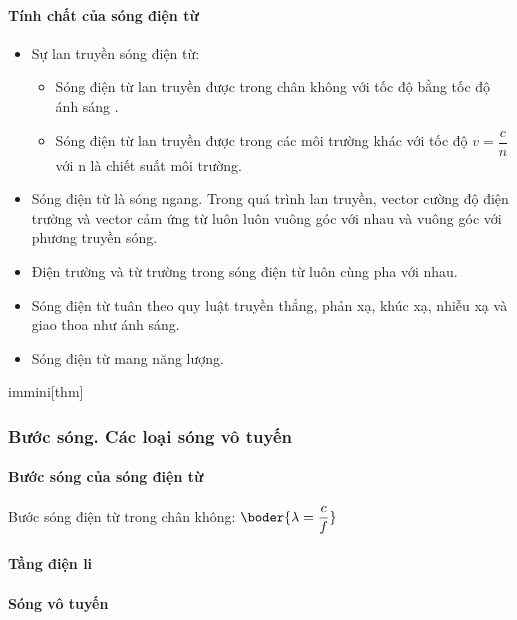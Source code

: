 \paragraph{Tính chất của sóng điện từ}
\begin{itemize}
\item Sự lan truyền sóng điện từ:
\begin{itemize}
\item Sóng điện từ lan truyền được trong chân không với tốc độ bằng tốc độ ánh sáng . 
\item Sóng điện từ lan truyền được trong các môi trường khác với tốc độ $v=\dfrac{c}{n}$ với n là chiết suất môi trường. 
\end{itemize}
\item Sóng điện từ là sóng ngang. Trong quá trình lan truyền, vector cường độ điện trường  và vector cảm ứng từ  luôn luôn vuông góc với nhau và vuông góc với phương truyền sóng. 
\item Điện trường và từ trường trong sóng điện từ luôn cùng pha với nhau.
\item Sóng điện từ tuân theo quy luật truyền thẳng, phản xạ, khúc xạ, nhiễu xạ và giao thoa như ánh sáng.
\item Sóng điện từ mang năng lượng.
\end{itemize}
immini[thm]{
\subsubsection{Bước sóng. Các loại sóng vô tuyến}
\paragraph{Bước sóng của sóng điện từ}
Bước sóng điện từ trong chân không: $\boder{\lambda=\dfrac{c}{f}}$ 
\paragraph{Tầng điện li}
\paragraph{Sóng vô tuyến}
}
